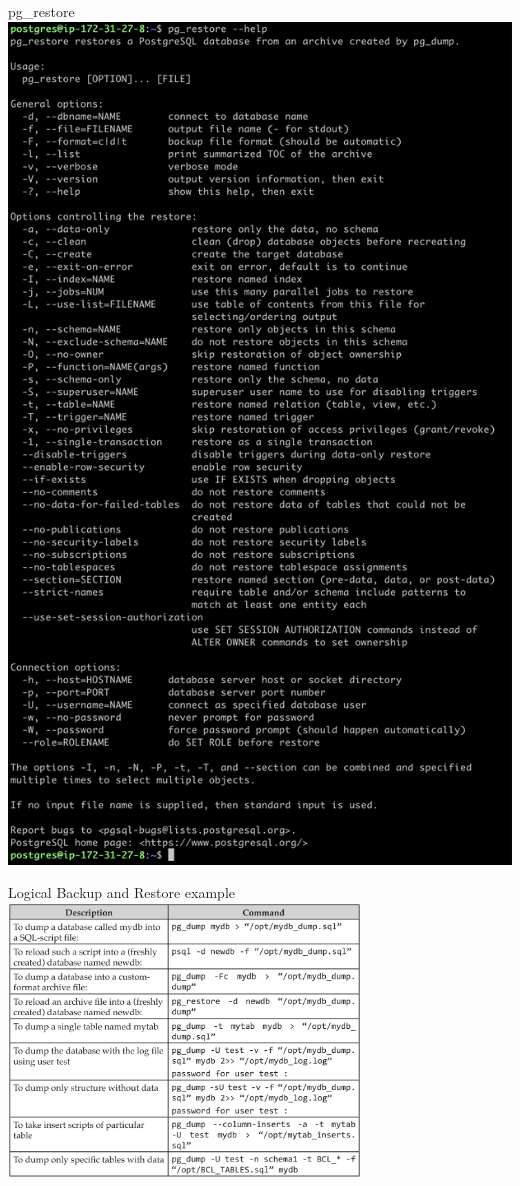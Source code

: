 \documentclass[aspectratio=169]{beamer}
\begin{document}
\begin{frame}{pg\_restore}
    \centering
    \includegraphics[width=\textwidth, trim={0cm 73cm 0cm 0cm}, clip]{figures/pg_restore}
\end{frame}

\begin{frame}{Logical Backup and Restore example}
    \centering
    \includegraphics[width=0.7\textwidth]{figures/table}
\end{frame}
\end{document}
